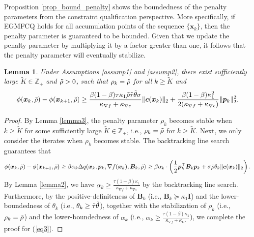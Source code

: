 \documentclass[aos]{imsart}
\numberwithin{equation}{section}
\theoremstyle{plain}
\newtheorem{lemma}{Lemma}
\begin{document}
\begin{appendix}
Proposition \ref{prop_bound_penalty} shows the boundedness of the penalty parameters from the constraint qualification perspective. More specifically, if EGMFCQ holds for all accumulation points of the sequence $\{\bm{x}_{k}\}$, then the penalty parameter is guaranteed to be bounded. Given that we update the penalty parameter by multiplying it by a factor greater than one, it follows that the penalty parameter will eventually stabilize.

 \begin{lemma}
 \label{lemma4}
     Under Assumptions \ref{assump1} and \ref{assump2}, there exist sufficiently large $\widetilde{K} \in \mathbb{Z}_{+}$ and $\Tilde{\rho}>0$, such that $\rho_k = \Tilde{\rho}$ for all $k \geq \widetilde{K}$ and 
     \begin{equation}
     \label{eq3}
         \phi(\bm{x}_{k},\Tilde{\rho}) - \phi(\bm{x}_{k+1},\Tilde{\rho}) \geq \frac{\beta (1-\beta) \tau\kappa_1 \Tilde{\rho} \Tilde{\tau} \Tilde{\theta} \sigma}{\kappa_{\nabla f}+\kappa_{\nabla c}} \|\bm{c}(\bm{x}_k)\|_2 + \frac{\beta (1-\beta)\kappa_1^2}{2(\kappa_{\nabla f}+\kappa_{\nabla c})} \|\bm{p}_k\|_2^2.
     \end{equation}
 \end{lemma}

 \begin{proof}
     By Lemma \ref{lemma3}, the penalty parameter $\rho_k$ becomes stable when $k \geq \widetilde{K}$ for some sufficiently large $\widetilde{K} \in \mathbb{Z}_{+}$, i.e., $\rho_k = \Tilde{\rho}$ for $k \geq \widetilde{K}$. Next, we only consider the iterates when $\rho_k$ becomes stable. The backtracking line search guarantees that
     \begin{equation*}
        \phi(\bm{x}_{k},\Tilde{\rho}) - \phi(\bm{x}_{k+1},\Tilde{\rho}) \geq  \beta \alpha_k \Delta q(\bm{x}_k,\bm{p}_k, \nabla f(\bm{x}_k),\bm{B}_k,\Tilde{\rho}) \geq \beta \alpha_k \cdot \left(\frac{1}{2} \bm{p}_k^{\top} \bm{B}_k \bm{p}_k + \sigma \Tilde{\rho} \theta_k \|\bm{c}(\bm{x}_k)\|_2\right).
     \end{equation*}
     By Lemma \ref{lemma2}, we have $\alpha_k \geq \frac{\tau (1-\beta)\kappa_1}{\kappa_{\nabla f}+\kappa_{\nabla c}}$ by the backtracking line search. Furthermore, by the positive-definiteness of $\bm{B}_k$ (i.e., $\bm{B}_k \succeq \kappa_1 \mathbf{I}$) and the lower-boundedness of $\theta_k$ (i.e., $\theta_k \geq \Tilde{\tau}\Tilde{\theta}$), together with the stabilization of $\rho_k$ (i.e., $\rho_k = \Tilde{\rho}$) and the lower-boundedness of $\alpha_k$ (i.e., $\alpha_k \geq \frac{\tau (1-\beta)\kappa_1}{\kappa_{\nabla f}+\kappa_{\nabla c}}$), we complete the proof for (\ref{eq3}). 
 \end{proof}



\end{appendix}
\end{document}
